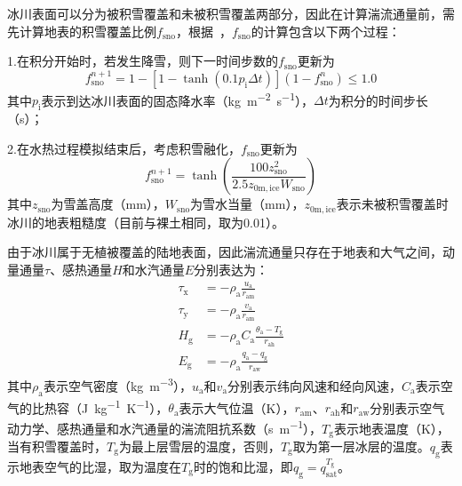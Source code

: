冰川表面可以分为被积雪覆盖和未被积雪覆盖两部分，因此在计算湍流通量前，需先计算地表的积雪覆盖比例$f_{\mathrm{sno}}$，根据~\citet{swenson2012new}，$f_{\mathrm{sno}}$的计算包含以下两个过程：

1.在积分开始时，若发生降雪，则下一时间步数的$f_{\mathrm{sno}}$更新为
\begin{equation}
  f^{n+1}_{\mathrm{sno}}=1-\left[1-\tanh{\left(0.1 p_{\mathrm {i}}  \Delta t\right)}\right]\left(1-f^n_{\mathrm{sno}}\right) \leqslant 1.0
\end{equation}
其中$p_{\mathrm {i}} $表示到达冰川表面的固态降水率（\unit{kg.m^{-2}.s^{-1}}），$\Delta t$为积分的时间步长（s）；

2.在水热过程模拟结束后，考虑积雪融化，$f_{\mathrm{sno}}$更新为
\begin{equation}
  f^{n+1}_{\mathrm{sno}}=\tanh \left(\frac{100 z^2_{\mathrm{sno}}}{2.5z_{\mathrm {0m,ice}} W_{\mathrm{sno}}}\right)
\end{equation}
其中$z_{\mathrm{sno}}$为雪盖高度（mm），$W_{\mathrm{sno}}$为雪水当量（mm），$z_{\mathrm {0m,ice}}$表示未被积雪覆盖时冰川的地表粗糙度（目前与裸土相同，取为0.01）。


由于冰川属于无植被覆盖的陆地表面，因此湍流通量只存在于地表和大气之间，动量通量$\tau$、感热通量$H$和水汽通量$E$分别表达为：
\begin{align}
  \tau_{\mathrm {x}}  &= -\rho_{\mathrm{a}} \frac{u_{\mathrm{a}}}{r_{\mathrm{am}}} \\
  \tau_{\mathrm {y}}  &= -\rho_{\mathrm{a}} \frac{v_{\mathrm{a}}}{r_{\mathrm{am}}} \\
  H_{\mathrm {g}}  &= -\rho_{\mathrm{a}} C_{\mathrm{a}} \frac{\theta_{\mathrm{a}}-T_{\mathrm {g}} }{r_{\mathrm{ah}}} \\
  E_{\mathrm {g}}  &= -\rho_{\mathrm{a}} \frac{q_{\mathrm{a}}-q_{\mathrm {g}} }{r_{\mathrm{aw}}}
\end{align}
其中$\rho_{\mathrm{a}}$表示空气密度（\unit{kg.m^{-3}}），$u_{\mathrm{a}}$和$v_{\mathrm{a}}$分别表示纬向风速和经向风速，$C_{\mathrm{a}}$表示空气的比热容（\unit{J.kg^{-1}.K^{-1}}），$\theta_{\mathrm{a}}$表示大气位温（K），$r_{\mathrm{am}}$、$r_{\mathrm{ah}}$和$r_{\mathrm{aw}}$分别表示空气动力学、感热通量和水汽通量的湍流阻抗系数（\unit{s.m^{-1}}），$T_{\mathrm {g}} $表示地表温度（K），当有积雪覆盖时，$T_{\mathrm {g}} $为最上层雪层的温度，否则，$T_{\mathrm {g}} $取为第一层冰层的温度。$q_{\mathrm {g}} $表示地表空气的比湿，取为温度在$T_{\mathrm {g}} $时的饱和比湿，即$q_{\mathrm {g}} =q^{T_{\mathrm {g}} }_{\mathrm{sat}}$。

